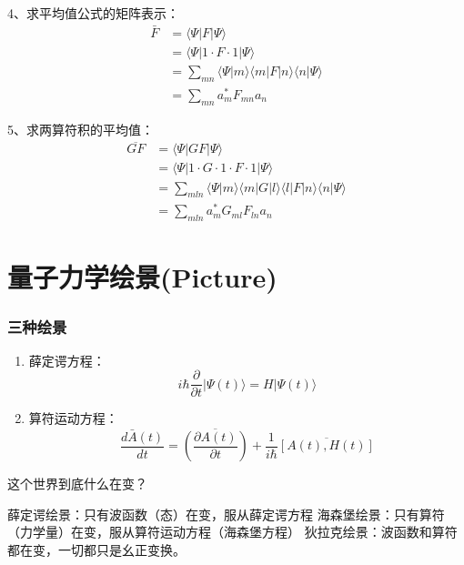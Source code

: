 \begin{frame} 
    4、求平均值公式的矩阵表示： 
    $$ \begin{aligned}
    \bar{F} &= \langle \Psi |F |\Psi \rangle  \\
    &= \langle \Psi |1 \cdot F \cdot 1 |\Psi \rangle  \\
    &= \sum_{mn} \langle \Psi |m\rangle\langle m |F| n\rangle\langle n |\Psi \rangle  \\
    &= \sum_{mn} a_m ^* F_{mn} a_n 
    \end{aligned}
    $$
\end{frame} 

\begin{frame} 
    5、求两算符积的平均值： 
    $$ \begin{aligned}
    \overline{GF} &= \langle \Psi |GF |\Psi \rangle  \\
    &= \langle \Psi |1 \cdot G \cdot 1 \cdot F \cdot 1 |\Psi \rangle  \\
    &= \sum_{mln} \langle \Psi |m\rangle\langle m |G |l\rangle\langle l| F| n\rangle\langle n |\Psi \rangle  \\
    &= \sum_{mln} a_m ^* G_{ml} F_{ln} a_n 
    \end{aligned}
    $$
\end{frame} 

\section{量子力学绘景(Picture)}

\begin{frame}  
    \frametitle{三种绘景}  
    \begin{enumerate}
        \item 薛定谔方程：$$ i\hbar \frac{\partial }{\partial t} |\Psi(t)\rangle = H|\Psi(t)\rangle $$
        \item 算符运动方程：$$ \frac{d\bar{A}(t)}{dt}=\overline{(\frac{\partial A(t) }{\partial t})}  +\frac{1}{i\hbar} \overline{[A(t),H(t)]}$$
    \end{enumerate}
    这个世界到底什么在变？\\
    \begin{itemize}
        \done 薛定谔绘景：只有波函数（态）在变，服从薛定谔方程
        \done 海森堡绘景：只有算符（力学量）在变，服从算符运动方程（海森堡方程）
        \done 狄拉克绘景：波函数和算符都在变，一切都只是幺正变换。
    \end{itemize}
\end{frame} 

